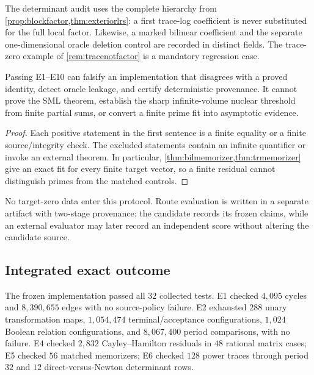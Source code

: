 The determinant audit uses the complete hierarchy from
\cref{prop:blockfactor,thm:exteriorlrs}: a first trace-log coefficient is
never substituted for the full local factor.  Likewise, a marked bilinear
coefficient and the separate one-dimensional oracle deletion control are
recorded in distinct fields.  The trace-zero example of
\cref{rem:tracenotfactor} is a mandatory regression case.

\begin{proposition}
\label{prop:auditsoundness}
Passing E1--E10 can falsify an implementation that disagrees with a proved
identity, detect oracle leakage, and certify deterministic provenance.  It
cannot prove the SML theorem, establish the sharp infinite-volume nuclear
threshold from finite partial sums, or convert a finite prime fit into
asymptotic evidence.
\end{proposition}

\begin{proof}
Each positive statement in the first sentence is a finite equality or a
finite source/integrity check.  The excluded statements contain an
infinite quantifier or invoke an external theorem.  In particular,
\cref{thm:bilmemorizer,thm:trmemorizer} give an exact fit for every finite
target vector, so a finite residual cannot distinguish primes from the
matched controls.
\end{proof}

No target-zero data enter this protocol.  Route evaluation is written in a
separate artifact with two-stage provenance: the candidate records its
frozen claims, while an external evaluator may later record an independent
score without altering the candidate source.

\subsection{Integrated exact outcome}

The frozen implementation passed all $32$ collected tests.  E1 checked
$4{,}095$ cycles and $8{,}390{,}655$ edges with no source-policy failure.
E2 exhausted $288$ unary transformation maps,
$1{,}054{,}474$ terminal/acceptance configurations, $1{,}024$ Boolean
relation configurations, and $8{,}067{,}400$ period comparisons, with no
failure.  E4 checked $2{,}832$ Cayley--Hamilton residuals in $48$ rational
matrix cases; E5 checked $56$ matched memorizers; E6 checked $128$ power
traces through period $32$ and $12$ direct-versus-Newton determinant rows.

